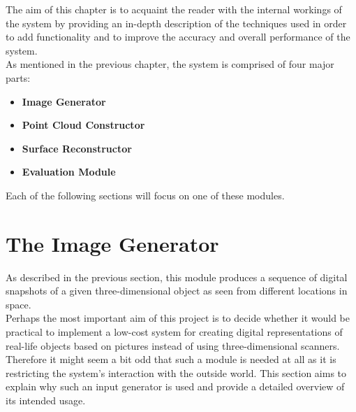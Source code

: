\documentclass[12pt,a4paper,twoside,openright]{report}
\begin{document}
The aim of this chapter is to acquaint the reader with the internal workings of the system by providing an in-depth description of the techniques used in order to add functionality and to improve the accuracy and overall performance of the system.\\
\linebreak
As mentioned in the previous chapter, the system is comprised of four major parts:
\begin{itemize}
\item \textbf{Image Generator}
\item \textbf{Point Cloud Constructor} 
\item \textbf{Surface Reconstructor}
\item \textbf{Evaluation Module}
\end{itemize}
Each of the following sections will focus on one of these modules. 


\section{The Image Generator}
As described in the previous section, this module produces a sequence of digital snapshots of a given three-dimensional object as seen from different locations in space. \\
Perhaps the most important aim of this project is to decide whether it would be practical to implement a low-cost system for creating digital representations of real-life objects based on pictures instead of using three-dimensional scanners. Therefore it might seem a bit odd that such a module is needed at all as it is restricting the system's interaction with the outside world. This section aims to explain why such an input generator is used and provide a detailed overview of its intended usage. 
\end{document}
